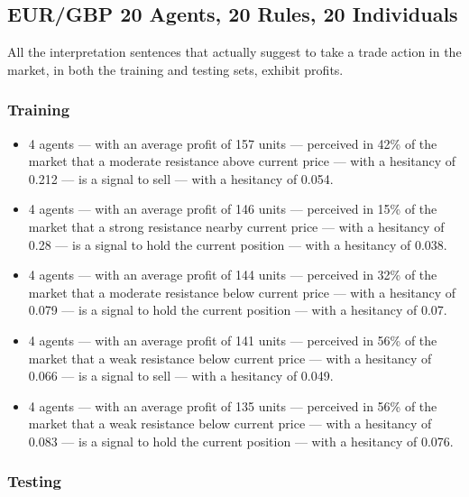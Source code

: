 \subsection{EUR/GBP 20 Agents, 20 Rules, 20 Individuals}
\label{}

All the interpretation sentences that actually suggest to take a trade action in the market, in both the training and testing sets, exhibit profits.

\subsubsection{Training}
\label{}

{\small
  \begin{itemize}
  \item 4 agents — with an average profit of 157 units — perceived in 42\% of
    the market that a moderate resistance above current price — with a hesitancy
    of 0.212 — is a signal to sell — with a hesitancy of 0.054.
  \item 4 agents — with an average profit of 146 units — perceived in 15\% of
    the market that a strong resistance nearby current price — with a hesitancy
    of 0.28 — is a signal to hold the current position — with a hesitancy of
    0.038.
  \item 4 agents — with an average profit of 144 units — perceived in 32\% of
    the market that a moderate resistance below current price — with a hesitancy
    of 0.079 — is a signal to hold the current position — with a hesitancy of
    0.07.
  \item 4 agents — with an average profit of 141 units — perceived in 56\% of
    the market that a weak resistance below current price — with a hesitancy of
    0.066 — is a signal to sell — with a hesitancy of 0.049.
  \item 4 agents — with an average profit of 135 units — perceived in 56\% of
    the market that a weak resistance below current price — with a hesitancy of
    0.083 — is a signal to hold the current position — with a hesitancy of
    0.076.
  \end{itemize}
}

\subsubsection{Testing}
\label{}

